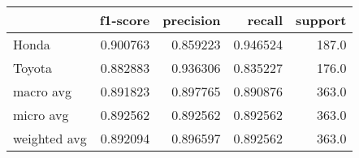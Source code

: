 \begin{tabular}{lrrrr}
\toprule
{} &  f1-score &  precision &    recall &  support \\
\midrule
Honda        &  0.900763 &   0.859223 &  0.946524 &    187.0 \\
Toyota       &  0.882883 &   0.936306 &  0.835227 &    176.0 \\
macro avg    &  0.891823 &   0.897765 &  0.890876 &    363.0 \\
micro avg    &  0.892562 &   0.892562 &  0.892562 &    363.0 \\
weighted avg &  0.892094 &   0.896597 &  0.892562 &    363.0 \\
\bottomrule
\end{tabular}

